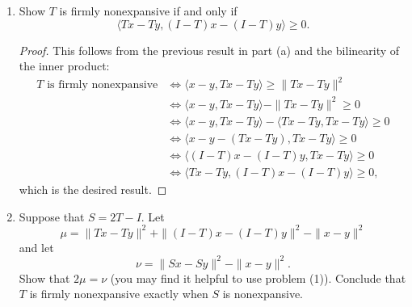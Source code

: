 \documentclass[11pt]{amsart}
\begin{document}
\begin{enumerate}
\begin{enumerate}
\begin{proof}
  ``$\Leftarrow$'': Suppose $T$ is firmly nonexpansive.


  Suppose $T$ is firmly nonexpansive.
  \begin{align*}
    \|Tx - Ty\|^2
    &+ \|(I-T) x - (I-T)y\|^2 \leq \|x-y\|^2 \\
    &\Leftrightarrow \|Tx - Ty\|^2 + \|(x-y)- (T x - T y)\|^2 \leq \|x-y\|^2 \\
    &\Leftrightarrow
      \|Tx - Ty\|^2 + \|(x-y)- (T x - T y)\|^2 \leq \|x-y\|^2 \\
    &\Leftrightarrow
      \|Tx - Ty\|^2 + \|x-y\|^2 + \|T x - T y)\|^2
      - 2\langle x - y, T x - T y\rangle \leq \|x-y\|^2 \\
    &\Leftrightarrow
      2\|Tx - Ty\|^2 \leq 2\langle x - y, T x - T y\rangle \\
    &\Leftrightarrow
      2\|Tx - Ty\|^2 \leq 2\langle x - y, T x - T y\rangle \\
    &\Leftrightarrow
      \langle x - y, T x - T y\rangle  \geq \|Tx - Ty\|^2,
  \end{align*}
  which is the desired result.
\end{proof}
\item Show $T$ is firmly nonexpansive if and only if 
\[
\langle Tx - Ty, (I-T)x - (I-T)y \rangle \geq 0. 
\]

\begin{proof}
  This follows from the previous result in part (a) and the bilinearity of the
  inner product:
  \begin{align*}
    \text{$T$ is firmly nonexpansive}
    &\Leftrightarrow \langle x-y, Tx - Ty \rangle \geq \|Tx - Ty\|^2 \\
    &\Leftrightarrow \langle x-y, Tx - Ty \rangle - \|Tx - Ty\|^2 \geq  0 \\
    &\Leftrightarrow \langle x-y, Tx - Ty \rangle - \langle Tx - Ty, Tx - Ty \rangle \geq  0 \\
    &\Leftrightarrow \langle x-y - (Tx - Ty), Tx - Ty \rangle \geq  0 \\
    &\Leftrightarrow \langle (I - T)x - (I - T)y, Tx - Ty \rangle \geq  0 \\
    &\Leftrightarrow \langle Tx - Ty, (I - T)x - (I - T)y \rangle \geq  0,
  \end{align*}
  which is the desired result.
\end{proof}

\item Suppose that $S = 2T - I$. Let 
\[
\mu = \|Tx - Ty\|^2 + \|(I-T)x - (I-T)y\|^2 - \|x-y\|^2
\]
and let 
\[
\nu = \|Sx - Sy\|^2 - \|x-y\|^2.
\]
Show that $2\mu = \nu$ (you may find it helpful to use problem (1)). Conclude that 
$T$ is firmly nonexpansive exactly when $S$ is nonexpansive.


\end{enumerate}
\end{enumerate}
\end{document}
